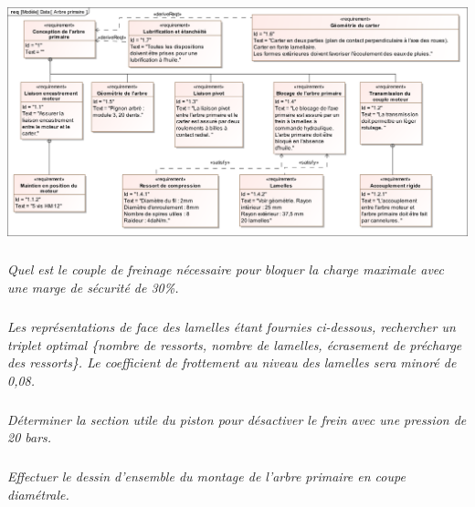 \documentclass[10pt]{article}
\begin{document}
\begin{center}
\includegraphics[width=\textwidth]{images/SysML/ArbrePrimaire.png}
\end{center}
%

\subparagraph{}
\textit{Quel est le couple de freinage nécessaire pour bloquer la charge maximale avec une marge de sécurité de 30\%.}

\subparagraph{}
\textit{Les représentations de face des lamelles étant fournies ci-dessous, rechercher un triplet optimal \{nombre de ressorts, nombre de lamelles, écrasement de précharge des ressorts\}. Le coefficient de frottement au niveau des lamelles sera minoré de 0,08.}

\subparagraph{}
\textit{Déterminer la section utile du piston pour désactiver le frein avec une pression de 20 bars.}

\subparagraph{}
\textit{Effectuer le dessin d'ensemble du montage de l'arbre primaire en coupe diamétrale.}
\end{document}
